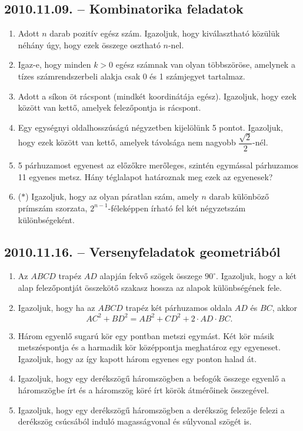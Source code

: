 \documentclass{article}
\begin{document}
\subsection*{2010.11.09. -- Kombinatorika feladatok}
\begin{enumerate}
\item Adott $n$ darab pozitív egész szám. Igazoljuk, hogy kiválasztható közülük néhány úgy, hogy ezek összege osztható $n$-nel.
\item Igaz-e, hogy minden $k>0$ egész számnak van olyan többszöröse, amelynek a 
tízes számrendszerbeli alakja csak 0 és 1 számjegyet tartalmaz.
\item Adott a síkon öt rácspont (mindkét koordinátája egész). Igazoljuk, hogy ezek között van kettő, amelyek felezőpontja is rácspont.
\item Egy egységnyi oldalhosszúságú négyzetben kijelölünk 5 pontot. Igazoljuk, hogy ezek között van kettő, amelyek távolsága nem nagyobb $\dfrac{\sqrt 2}{2}$-nél.
\item 5 párhuzamost egyenest az előzőkre merőleges, szintén egymással párhuzamos 11 egyenes metsz. Hány téglalapot határoznak meg ezek az egyenesek?
\item ($*$) Igazoljuk, hogy az olyan páratlan szám, amely $n$ darab különböző prímszám szorzata, $2^{n-1}$-féleképpen írható fel két négyzetszám különbségeként.
\end{enumerate}

\subsection*{2010.11.16. -- Versenyfeladatok geometriából}
\begin{enumerate}
\item Az $ABCD$ trapéz $AD$ alapján fekvő szögek összege $90^\circ$. Igazoljuk, hogy a két alap felezőpontját összekötő szakasz hossza az alapok különbségének fele.
\item Igazoljuk, hogy ha az $ABCD$ trapéz két párhuzamos oldala $AD$ és $BC$, akkor $$AC^2+BD^2=AB^2+CD^2+2\cdot AD\cdot BC.$$
\item Három egyenlő sugarú kör egy pontban metszi egymást. Két kör másik metszéspontja és a harmadik kör középpontja meghatároz egy egyeneset. Igazoljuk, hogy az így kapott három egyenes egy ponton halad át.
\item Igazoljuk, hogy egy derékszögű háromszögben a befogók összege egyenlő a háromszögbe írt és a háromszög köré írt körök átmérőinek összegével.
\item Igazoljuk, hogy egy derékszögű háromszögben a derékszög felezője felezi a derékszög csúcsából induló magasságvonal és súlyvonal szögét is.
\end{enumerate}
\end{document}
